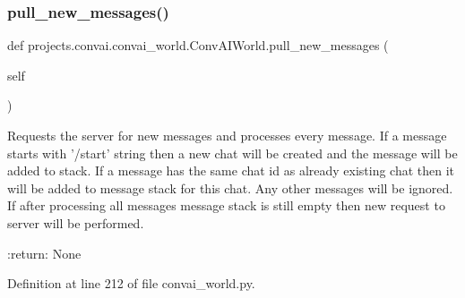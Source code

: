 \mbox{\label{classprojects_1_1convai_1_1convai__world_1_1ConvAIWorld_ae915e7b5fafab4ea517fb30be05565b4}} 
\subsubsection{\texorpdfstring{pull\+\_\+new\+\_\+messages()}{pull\_new\_messages()}}
{\footnotesize\ttfamily def projects.\+convai.\+convai\+\_\+world.\+Conv\+A\+I\+World.\+pull\+\_\+new\+\_\+messages (\begin{DoxyParamCaption}\item[{}]{self }\end{DoxyParamCaption})}

\begin{DoxyVerb}Requests the server for new messages and processes every message. If a message
starts with '/start' string then a new chat will be created and the message will
be added to stack. If a message has the same chat id as already existing chat
then it will be added to message stack for this chat. Any other messages will be
ignored. If after processing all messages message stack is still empty then new
request to server will be performed.

:return: None
\end{DoxyVerb}
 

Definition at line 212 of file convai\+\_\+world.\+py.


